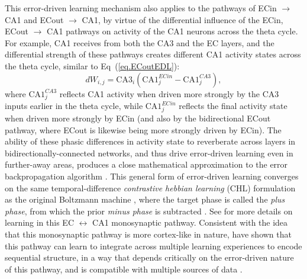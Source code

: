 \documentclass[11pt,twoside]{article}
\newif\myifpdf
\begin{document}
This error-driven learning mechanism also applies to the pathways of ECin $\rightarrow$ CA1 and ECout $\rightarrow$ CA1, by virtue of the differential influence of the ECin, ECout $\rightarrow$ CA1 pathways on activity of the CA1 neurons across the theta cycle.  For example, CA1 receives from both the CA3 and the EC layers, and the differential strength of these pathways creates different CA1 activity states across the theta cycle, similar to Eq~(\ref{eq.ECoutEDL}):
\begin{equation}
\label{eq.CA1EDL}
    dW_{i,j} = \mbox{CA3}_i ( \mbox{CA1}_j^{ECin} - \mbox{CA1}_j^{CA3} ) ,
\end{equation}
where $\mbox{CA1}_j^{CA3}$ reflects CA1 activity when driven more strongly by the CA3 inputs earlier in the theta cycle, while $\mbox{CA1}_j^{ECin}$ reflects the final activity state when driven more strongly by ECin (and also by the bidirectional ECout pathway, where ECout is likewise being more strongly driven by ECin).  The ability of these phasic differences in activity state to reverberate across layers in bidirectionally-connected networks, and thus drive error-driven learning even in further-away areas, produces a close mathematical approximation to the error backpropagation algorithm \citep{OReilly96,WhittingtonBogacz19,LillicrapSantoroMarrisEtAl20}.  This general form of error-driven learning converges on the same temporal-difference \emph{contrastive hebbian learning} (CHL) formulation as the original Boltzmann machine \citep{AckleyHintonSejnowski85}, where the target phase is called the \emph{plus phase}, from which the prior \emph{minus phase} is subtracted \citep{OReillyMunakataFrankEtAl12,OReillyMunakata00,OReillyRussinZolfagharEtAl21}.  See \citet{KetzMorkondaOReilly13} for more details on learning in this EC $\leftrightarrow$ CA1 monosynaptic pathway.  Consistent with the idea that this monosynaptic pathway is more cortex-like in nature, \citet{SchapiroTurk-BrowneBotvinickEtAl17} have shown that this pathway can learn to integrate across multiple learning experiences to encode sequential structure, in a way that depends critically on the error-driven nature of this pathway, and is compatible with multiple sources of data \citep{SchapiroTurk-BrowneNormanEtAl16}.
\end{document}
